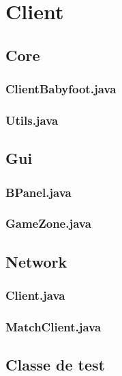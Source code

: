\chapter{Client}
	\section{Core}
        \subsection{ClientBabyfoot.java}
            
        \subsection{Utils.java}
            
    \section{Gui}
        \subsection{BPanel.java}
            
        \subsection{GameZone.java}
            
            
    \section{Network}
        \subsection{Client.java}
            
        \subsection{MatchClient.java}
            
    \section{Classe de test}
        
